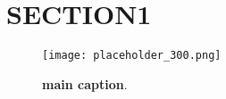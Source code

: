 \section{SECTION1}
\lipsum[1-4]


\begin{figure}[H]
  \centering
    \texttt{[image: placeholder\_300.png]}
    \caption[main caption]
    {
      \textbf{main caption}\protect\footnotemark.
      \blindtext
    }
    \label{\figname{1}{1}}
\end{figure}
\footnotetext{\blindtext}
